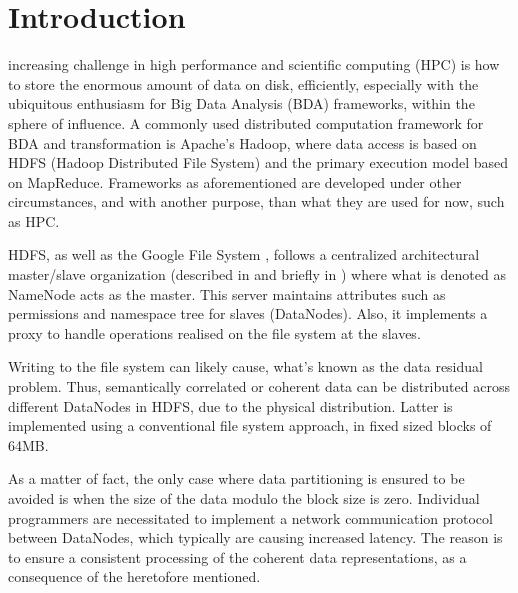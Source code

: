 \chapter{Introduction} \label{chap:introduction}

 increasing challenge in high performance and scientific computing (HPC) is how to store the enormous amount of data on disk, efficiently, especially with the ubiquitous enthusiasm for Big Data Analysis (BDA) frameworks, within the sphere of influence. A commonly used distributed computation framework for BDA and transformation is Apache's Hadoop\cite{PageHadoop}, where data access is based on HDFS (Hadoop Distributed File System) \cite{Shvachko:2010:HDF:1913798.1914427} and the primary execution model based on MapReduce\cite{Dean:2008:MSD:1327452.1327492}. Frameworks as aforementioned are developed under other circumstances, and with another purpose, than what they are used for now, such as HPC. 
\newline

HDFS, as well as the Google File System \cite{Ghemawat:2003:GFS:945445.945450}, follows a centralized architectural master/slave organization (described in \eg \cite{Tanenbaum:2006:DSP:1202502} and briefly in \cite{Wilkinson:1998:PPT:289352}) where what is denoted as NameNode acts as the master. This server maintains attributes such as permissions and namespace tree for slaves (DataNodes). Also, it implements a proxy to handle operations realised on the file system at the slaves. 
\newline

Writing to the file system can likely cause, what's known as the data residual problem. Thus, semantically correlated or coherent data can be distributed across different DataNodes in HDFS, due to the physical distribution. Latter is implemented using a conventional file system approach, \ie in fixed sized blocks of 64MB. 
\newpage

As a matter of fact, the only case where data partitioning is ensured to be avoided is when the size of the data modulo the block size is zero. Individual programmers are necessitated to implement a network communication protocol between DataNodes, which typically are causing increased latency. The reason is to ensure a consistent processing of the coherent data representations, as a consequence of the heretofore mentioned.
\newline


